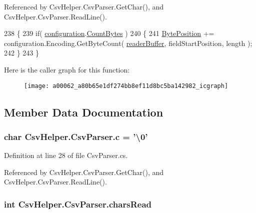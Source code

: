 Referenced by Csv\-Helper.\-Csv\-Parser.\-Get\-Char(), and Csv\-Helper.\-Csv\-Parser.\-Read\-Line().


\begin{DoxyCode}
238         \{
239             \textcolor{keywordflow}{if}( \hyperlink{a00062_aeb171813d1526839ccd41d60ab6483b2}{configuration}.\hyperlink{a00057_af774e3cb6d18788006deec71879f54a1}{CountBytes} )
240             \{
241                 \hyperlink{a00062_a6fd7255ce9ae33029aafcaab07205047}{BytePosition} += configuration.Encoding.GetByteCount( 
      \hyperlink{a00062_ad8b27f20be101a15ef390fcc37f8631b}{readerBuffer}, fieldStartPosition, length );
242             \}
243         \}
\end{DoxyCode}


Here is the caller graph for this function\-:
\nopagebreak
\begin{figure}[H]
\begin{center}
\leavevmode
\texttt{[image: a00062\_a80b65e1df274bb8ef11d8bc5ba142982\_icgraph]}
\end{center}
\end{figure}




\subsection{Member Data Documentation}
\hypertarget{a00062_ae56cb79868b308d55a44c4c4b7cd22d1}{
\subsubsection[{c}]{\setlength{\rightskip}{0pt plus 5cm}char Csv\-Helper.\-Csv\-Parser.\-c = '\textbackslash{}0'\hspace{0.3cm}{\ttfamily [private]}}}\label{a00062_ae56cb79868b308d55a44c4c4b7cd22d1}


Definition at line 28 of file Csv\-Parser.\-cs.



Referenced by Csv\-Helper.\-Csv\-Parser.\-Get\-Char(), and Csv\-Helper.\-Csv\-Parser.\-Read\-Line().

\hypertarget{a00062_a9300effd525a71c2a377bde2586da9ae}{
\subsubsection[{chars\-Read}]{\setlength{\rightskip}{0pt plus 5cm}int Csv\-Helper.\-Csv\-Parser.\-chars\-Read\hspace{0.3cm}{\ttfamily [private]}}}\label{a00062_a9300effd525a71c2a377bde2586da9ae}


